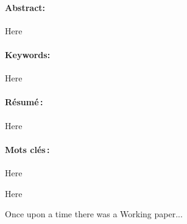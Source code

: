 \documentclass[gdpaper]{geradwp}
\begin{document}
	
	
	\GDpageCouverture
	
	\begin{GDpagetitre}
		
		\begin{GDauthlist}
		\end{GDauthlist}
		
		\begin{GDaffillist}
		\end{GDaffillist}
	
		\begin{GDemaillist}
		\end{GDemaillist}
	
	\end{GDpagetitre}


	\GDabstract
	
	\paragraph{Abstract: }
	Here
	
	\paragraph{Keywords: }
	Here
	\vspace*{2cm}
	
	
	\paragraph{R\'esum\'e\,: }
	Here
	
	\paragraph{Mots cl\'es\,: }
	Here
	
	\GDacknowledgements
	Here
	
	\GDwpstart
	
	Once upon a time there was a Working paper...
\end{document}
